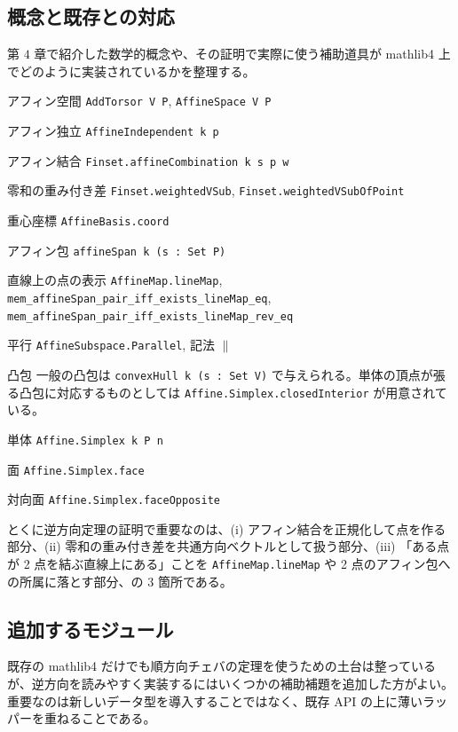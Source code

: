 \documentclass[a4paper,12pt]{bxjsbook}
\newlength{\customindent}
\newenvironment{body}{
  \par
  \begingroup
  \setlength{\leftskip}{\customindent}
  \setlength{\rightskip}{0pt}
  \setlength{\parindent}{1em}
  \setlength{\displayindent}{\customindent}
  \setlength{\displaywidth}{\dimexpr\linewidth-\customindent\relax}
}{
  \par
  \endgroup
}
\theoremstyle{theorem}
\begin{document}
    \subsection{概念と既存との対応}
    \begin{body}
        \indent 第 $4$ 章で紹介した数学的概念や、その証明で実際に使う補助道具が mathlib4 上でどのように実装されているかを整理する。
        \begin{bodydescription}[style=nextline,leftmargin=4.5em,labelsep=1em,font=\normalfont\bfseries,itemsep=0pt, topsep=2pt, parsep=0pt]
          \item[アフィン空間] \texttt{AddTorsor V P}, \texttt{AffineSpace V P}
          \item[アフィン独立] \texttt{AffineIndependent k p}
          \item[アフィン結合] \texttt{Finset.affineCombination k s p w}
          \item[零和の重み付き差] \nolinkurl{Finset.weightedVSub}, \nolinkurl{Finset.weightedVSubOfPoint}
          \item[重心座標] \texttt{AffineBasis.coord}
          \item[アフィン包] \texttt{affineSpan k (s : Set P)}
          \item[直線上の点の表示] \nolinkurl{AffineMap.lineMap}, \nolinkurl{mem_affineSpan_pair_iff_exists_lineMap_eq}, \nolinkurl{mem_affineSpan_pair_iff_exists_lineMap_rev_eq}
          \item[平行] \texttt{AffineSubspace.Parallel}, 記法 $\parallel$
          \item[凸包] 一般の凸包は \texttt{convexHull k (s : Set V)} で与えられる。単体の頂点が張る凸包に対応するものとしては \texttt{Affine.Simplex.closedInterior} が用意されている。
          \item[単体] \texttt{Affine.Simplex k P n}
          \item[面] \texttt{Affine.Simplex.face}
          \item[対向面] \texttt{Affine.Simplex.faceOpposite}
        \end{bodydescription}

        \indent とくに逆方向定理の証明で重要なのは、(i) アフィン結合を正規化して点を作る部分、(ii) 零和の重み付き差を共通方向ベクトルとして扱う部分、(iii) 「ある点が 2 点を結ぶ直線上にある」ことを \nolinkurl{AffineMap.lineMap} や 2 点のアフィン包への所属に落とす部分、の 3 箇所である。
    \end{body}


    \subsection{追加するモジュール}
    \begin{body}
        \indent 既存の mathlib4 だけでも順方向チェバの定理を使うための土台は整っているが、逆方向を読みやすく実装するにはいくつかの補助補題を追加した方がよい。重要なのは新しいデータ型を導入することではなく、既存 API の上に薄いラッパーを重ねることである。
    \end{body}
\end{document}
